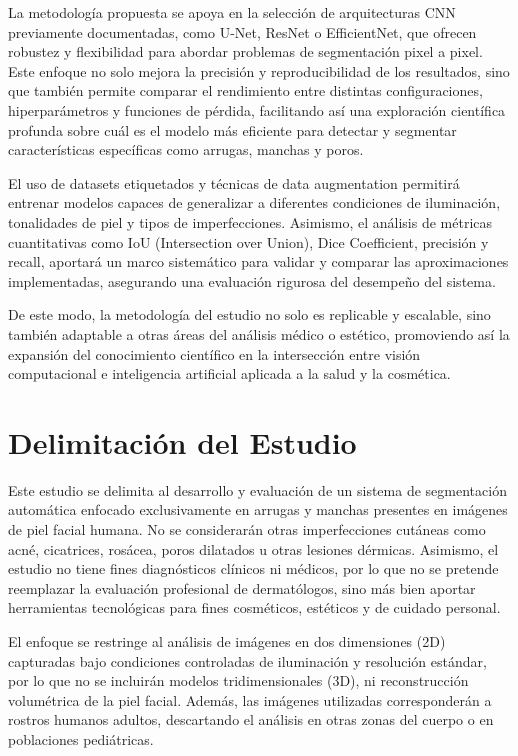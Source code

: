 La metodología propuesta se apoya en la selección de arquitecturas CNN previamente documentadas, como U-Net, ResNet o EfficientNet, que ofrecen robustez y flexibilidad para abordar problemas de segmentación pixel a pixel. Este enfoque no solo mejora la precisión y reproducibilidad de los resultados, sino que también permite comparar el rendimiento entre distintas configuraciones, hiperparámetros y funciones de pérdida, facilitando así una exploración científica profunda sobre cuál es el modelo más eficiente para detectar y segmentar características específicas como arrugas, manchas y poros.

El uso de datasets etiquetados y técnicas de data augmentation permitirá entrenar modelos capaces de generalizar a diferentes condiciones de iluminación, tonalidades de piel y tipos de imperfecciones. Asimismo, el análisis de métricas cuantitativas como IoU (Intersection over Union), Dice Coefficient, precisión y recall, aportará un marco sistemático para validar y comparar las aproximaciones implementadas, asegurando una evaluación rigurosa del desempeño del sistema.

De este modo, la metodología del estudio no solo es replicable y escalable, sino también adaptable a otras áreas del análisis médico o estético, promoviendo así la expansión del conocimiento científico en la intersección entre visión computacional e inteligencia artificial aplicada a la salud y la cosmética.

\section{Delimitación del Estudio}
Este estudio se delimita al desarrollo y evaluación de un sistema de segmentación automática enfocado exclusivamente en arrugas y manchas presentes en imágenes de piel facial humana. No se considerarán otras imperfecciones cutáneas como acné, cicatrices, rosácea, poros dilatados u otras lesiones dérmicas. Asimismo, el estudio no tiene fines diagnósticos clínicos ni médicos, por lo que no se pretende reemplazar la evaluación profesional de dermatólogos, sino más bien aportar herramientas tecnológicas para fines cosméticos, estéticos y de cuidado personal.

El enfoque se restringe al análisis de imágenes en dos dimensiones (2D) capturadas bajo condiciones controladas de iluminación y resolución estándar, por lo que no se incluirán modelos tridimensionales (3D), ni reconstrucción volumétrica de la piel facial. Además, las imágenes utilizadas corresponderán a rostros humanos adultos, descartando el análisis en otras zonas del cuerpo o en poblaciones pediátricas.


